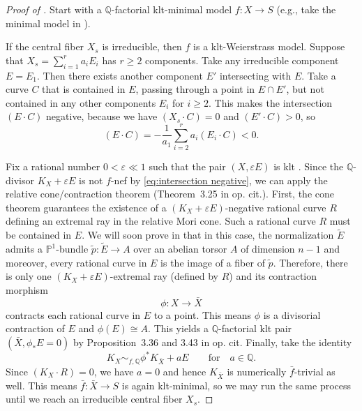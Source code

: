 \documentclass[reqno, letterpaper]{amsart}
\numberwithin{equation}{subsection}
\let\to\longrightarrow
\newcommand{\PP}{\mathbb{P}}
\newcommand{\QQ}{\mathbb{Q}}
\begin{document}
		\begin{proof}[Proof of ]
			Start with a $\QQ$-factorial klt-minimal model $f : X \to S$ (e.g., take the minimal model in ).
			
			\medskip
			
			If the central fiber $X_s$ is irreducible, then $f$ is a klt-Weierstrass model. Suppose that $X_s = \sum_{i=1}^r a_i E_i$ has $r \ge 2$ components. Take any irreducible component $E = E_1$. Then there exists another component $E'$ intersecting with $E$. Take a curve $C$ that is contained in $E$, passing through a point in $E \cap E'$, but not contained in any other components $E_i$ for $i \ge 2$. This makes the intersection $(E \cdot C)$ negative, because we have $(X_s \cdot C) = 0$ and $(E' \cdot C) > 0$, so
			\begin{equation} \label{eq:intersection negative}
				(E \cdot C) = -\frac{1}{a_1} \sum_{i=2}^r a_i (E_i \cdot C) < 0 .
			\end{equation}
			
			Fix a rational number $0 < \varepsilon \ll 1$ such that the pair $(X, \varepsilon E)$ is klt \cite[Corollary~2.35]{kol-mori}. Since the $\QQ$-divisor $K_X + \varepsilon E$ is not $f$-nef by \eqref{eq:intersection negative}, we can apply the relative cone/contraction theorem (Theorem~3.25 in op. cit.). First, the cone theorem guarantees the existence of a $(K_X + \varepsilon E)$-negative rational curve $R$ defining an extremal ray in the relative Mori cone. Such a rational curve $R$ must be contained in $E$. We will soon prove in  that in this case, the normalization $\tilde E$ admits a $\PP^1$-bundle $\tilde p : \tilde E \to A$ over an abelian torsor $A$ of dimension $n-1$ and moreover, every rational curve in $E$ is the image of a fiber of $\tilde p$. Therefore, there is only one $(K_X + \varepsilon E)$-extremal ray (defined by $R$) and its contraction morphism
			\[ \phi : X \to \bar X \]
			contracts each rational curve in $E$ to a point. This means $\phi$ is a divisorial contraction of $E$ and $\phi(E) \cong A$. This yields a $\QQ$-factorial klt pair $(\bar X, \phi_*E = 0)$ by Proposition~3.36 and 3.43 in op. cit. Finally, take the identity
			\[ K_X \sim_{f, \QQ} \phi^* K_{\bar X} + a E \qquad\mbox{for}\quad a \in \QQ .\]
			Since $(K_X \cdot R) = 0$, we have $a = 0$ and hence $K_{\bar X}$ is numerically $\bar f$-trivial as well. This means $\bar f : \bar X \to S$ is again klt-minimal, so we may run the same process until we reach an irreducible central fiber $X_s$.
		\end{proof}
		
\end{document}
